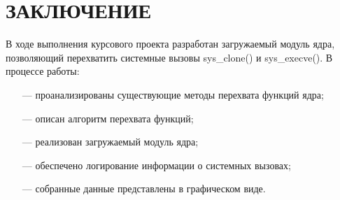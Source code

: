 \section*{ЗАКЛЮЧЕНИЕ}

В ходе выполнения курсового проекта разработан загружаемый модуль ядра, позволяющий перехватить системные вызовы sys\_clone() и sys\_execve(). В процессе работы:

\begin{itemize}[leftmargin=0.7cm +  - ]
	\item[---] проанализированы существующие методы перехвата функций ядра;
	\item[---] описан алгоритм перехвата функций;
	\item[---] реализован загружаемый модуль ядра;
	\item[---] обеспечено логирование информации о системных вызовах;
	\item[---] собранные данные представлены в графическом виде.
\end{itemize}

\pagebreak